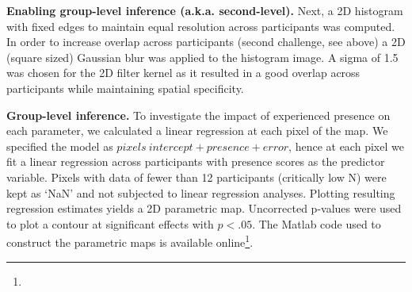 \textbf{Enabling group-level inference (a.k.a. second-level).} Next, a 2D histogram with fixed edges to maintain equal resolution across participants was computed. In order to increase overlap across participants (second challenge, see above) a 2D (square sized) Gaussian blur was applied to the histogram image. A sigma of 1.5 was chosen for the 2D filter kernel as it resulted in a good overlap across participants while maintaining spatial specificity. 

\textbf{Group-level inference.} To investigate the impact of experienced presence on each parameter, we calculated a linear regression at each pixel of the map. We specified the model as $pixels ~ intercept + presence + error$, hence at each pixel we fit a linear regression across participants with presence scores as the predictor variable. Pixels with data of fewer than 12 participants (critically low N) were kept as `NaN' and not subjected to linear regression analyses. Plotting resulting regression estimates yields a 2D parametric map. Uncorrected p-values were used to plot a contour at significant effects with $p < .05$. The Matlab code used to construct the parametric maps is available online\footnote{}.


